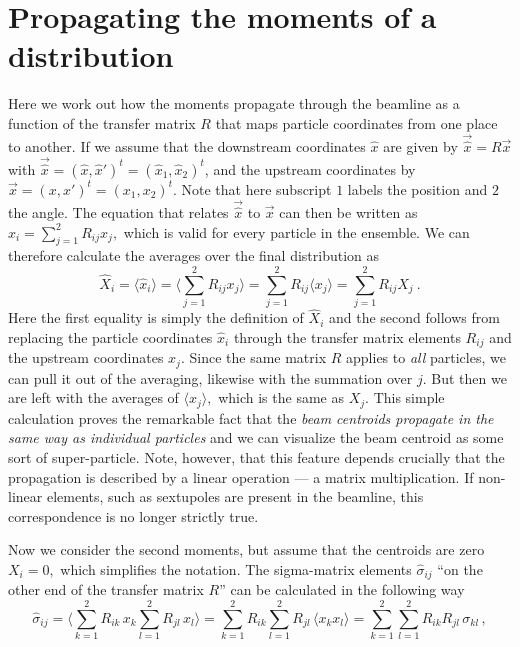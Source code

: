 \documentclass{article}
\begin{document}
\section{Propagating the moments of a distribution}
\label{sec:propmom}
%
Here we work out how the moments propagate through the beamline as a function
of the transfer matrix $R$ that maps particle coordinates from one place to another.
If we assume that the downstream coordinates $\hat x$ are given by $\vec{\hat x} = R\vec x$
with $\vec{\hat x}=(\hat x,\hat x')^t=(\hat x_1,\hat x_2)^t$, and the upstream 
coordinates by $\vec x=(x,x')^t=(x_1,x_2)^t.$ Note that here subscript $1$ labels 
the position and $2$ the angle. The equation that relates $\vec{\hat x}$ to $\vec x$ 
can then be written as $\hat x_i = \sum_{j=1}^2 R_{ij}x_j,$ which is valid for every particle
in the ensemble. We can therefore calculate the averages over the final distribution as
\begin{equation}\label{eq:xtransp}
\hat X_i = \langle \hat x_i\rangle = \langle \sum_{j=1}^2 R_{ij} x_j\rangle 
=  \sum_{j=1}^2 R_{ij}\langle x_j\rangle = \sum_{j=1}^2 R_{ij} X_j\ .
\end{equation}
Here the first equality is simply the definition of $\hat X_i$ and the second follows from
replacing the particle coordinates $\hat x_i$ through the transfer matrix elements $R_{ij}$ 
and the upstream coordinates $x_j.$ Since the same matrix $R$ applies to {\em all} particles,
we can pull it out of the averaging, likewise with the summation over $j.$ But then we are 
left with the averages of $\langle x_j\rangle,$ which is the same as $X_j.$ This simple 
calculation proves the remarkable fact that the {\em beam centroids propagate in the same 
way as individual particles} and we can visualize the beam centroid as some sort of
super-particle. Note, however, that this feature depends crucially that the propagation
is described by a linear operation --- a matrix multiplication. If non-linear elements, such
as sextupoles are present in the beamline, this correspondence is no longer strictly true.
\par
Now we consider the second moments, but assume that the centroids are zero $X_i=0,$ which
simplifies the notation. The sigma-matrix elements $\hat\sigma_{ij}$ ``on the other end of 
the transfer matrix $R$'' can be calculated in the following way
\begin{equation}\label{eq:sigma1}
\hat\sigma_{ij} 
  =  \langle \sum_{k=1}^2 R_{ik}\, x_k \sum_{l=1}^2 R_{jl}\, x_l \rangle
  =   \sum_{k=1}^2 R_{ik}  \sum_{l=1}^2 R_{jl}\, \langle x_k x_l \rangle
  =  \sum_{k=1}^2\sum_{l=1}^2 R_{ik} R_{jl}\, \sigma_{kl}\, ,
\end{equation}
\end{document}
